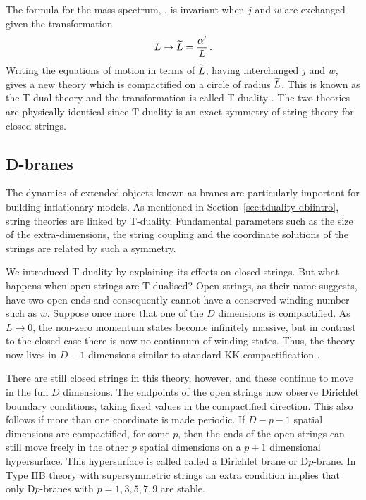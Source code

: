 The formula for the mass spectrum, , is invariant
when $j$ and $w$ are exchanged given the transformation
\begin{equation}
 L \rightarrow \widetilde{L} = \frac{\alpha'}{L}\,.
\end{equation}
Writing the equations of motion in terms of $\widetilde{L}$, having interchanged $j$ and
$w$,
gives a new theory
which is compactified on a circle of radius $\widetilde{L}$. This is known as the
T-dual theory and the transformation is called T-duality
\cite{Sakai1986,Kikkawa1984b}. The two
theories are physically identical since T-duality is an exact symmetry
of string theory for closed strings.

% 
\subsection{D-branes}
\label{sec:dbranes-dbiintro}
The dynamics of extended objects known as branes are particularly important for
building inflationary models.
As mentioned in Section~\ref{sec:tduality-dbiintro}, string
theories are linked by T-duality. Fundamental parameters such as the size of the
extra-dimensions, the string coupling and the
coordinate solutions of the strings are related by such a symmetry.


We introduced T-duality by explaining
its effects on closed strings. But what happens when open strings are
T-dualised? Open strings, as their name suggests, have two open ends and
consequently cannot have a conserved winding number such as $w$. Suppose once more
that one
of the $D$ dimensions is compactified. As $L\rightarrow0$, the non-zero momentum
states become infinitely massive, but in contrast to the closed case there is now
no continuum of winding states. Thus, the theory now lives in $D-1$ dimensions
similar to standard KK compactification \cite{Johnson2000}.

There are still closed strings in this theory, however, and these continue to
move in the full $D$ dimensions. The endpoints of the open strings now observe
Dirichlet boundary conditions, taking fixed values in the compactified
direction. This also follows if more than one coordinate is made periodic.
If $D-p-1$ spatial dimensions are compactified, for some $p$, then the ends of
the open
strings can still move freely in the other $p$ spatial dimensions on a $p+1$
dimensional hypersurface. This hypersurface is called called a Dirichlet brane or
D$p$-brane. 
% 
In Type IIB theory with supersymmetric strings an extra condition implies that
only D$p$-branes with $p=1,3,5,7,9$ are stable\footnotemark.
% 

